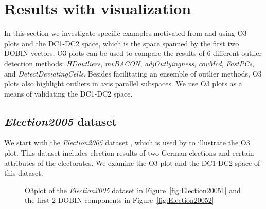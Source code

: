 \documentclass[letter,12pt]{article}
\begin{document}
\section{Results with visualization}\label{sec:ResWithVis}

In this section we investigate specific examples motivated from \cite{unwin2019multivariate} and \cite{wilkinson2017visualizing} using O3 plots and the DC1-DC2 space, which is the space spanned by the first two DOBIN vectors. O3 plots \citep{unwin2019multivariate} can be used to compare the results of $6$ different outlier detection methods: \textit{HDoutliers}, \textit{mvBACON}, \textit{adjOutlyingness}, \textit{covMcd}, \textit{FastPCs}, and \textit{DetectDeviatingCells}. Besides facilitating an ensemble of outlier methods, O3 plots also highlight outliers in axis parallel subspaces. We use O3 plots as a means of validating the DC1-DC2 space.

\subsection{\textit{Election2005} dataset}\label{sec:ResWithVis1}

We start with the \textit{Election2005} dataset \citep{mbgraphic}, which is used by \cite{unwin2019multivariate} to illustrate the O3 plot. This dataset includes election results of two German elections and certain attributes of the electorates. We examine the O3 plot and the DC1-DC2 space of this dataset.

\begin{figure}[!ht]
	\centering
	\hfill
	\caption{O3plot of the \textit{Election2005} dataset in Figure~\ref{fig:Election20051} and the first 2 DOBIN components in Figure~\ref{fig:Election20052} }
	\label{fig:Election2005}
\end{figure}
\end{document}
